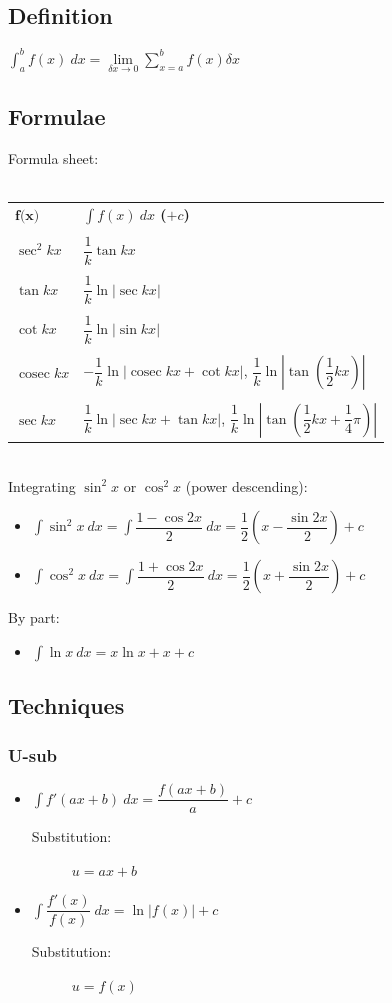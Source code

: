 \documentclass[A4paper]{article}
\DeclareMathOperator\cosec{cosec}
\begin{document}
	\subsection{Definition}
	$\int_{a}^{b} f(x) \: dx = \lim\limits_{\delta x\rightarrow0}\sum_{x=a}^{b}f(x)\delta x$
	
	\subsection{Formulae}
	Formula sheet:\\\\
	\begin{tabular}{ll}
	$\textbf{f(x)}$	& \textbf{$\int f(x) \: dx$ ($+c$)} \\&\\ 
	$\sec^2kx$	& $\dfrac{1}{k} \tan kx$ \\&\\
	$\tan kx$	& $\dfrac{1}{k} \ln |\sec kx|$ \\&\\
	$\cot kx$	& $\dfrac{1}{k} \ln |\sin kx|$ \\&\\
	$\cosec kx$	& $-\dfrac{1}{k} \ln |\cosec kx + \cot kx|$, $\dfrac{1}{k} \ln |\tan (\dfrac{1}{2}kx)|$ \\&\\
	$\sec kx$	& $\dfrac{1}{k} \ln |\sec kx + \tan kx|$, $\dfrac{1}{k} \ln |\tan (\dfrac{1}{2}kx+\dfrac{1}{4}\pi)|$ \\

	\end{tabular}\\
	Integrating $\sin^2x$ or $\cos^2x$ (power descending):
	\begin{itemize}
		\item $\int \sin ^2 x \: dx=\int \dfrac{1-\cos 2x}{2} \: dx=\dfrac{1}{2}(x-\dfrac{\sin 2x}{2})+c$
		\item $\int \cos ^2 x \: dx=\int \dfrac{1+\cos 2x}{2} \: dx= \dfrac{1}{2}(x+\dfrac{\sin 2x}{2})+c$
	\end{itemize}
	By part:
	\begin{itemize}
		\item $\int \ln x \: dx = x\ln x + x + c$
	\end{itemize}
	\subsection{Techniques}
	\subsubsection{U-sub}
	\begin{itemize}
		\item $\int f'(ax+b) \: dx = \dfrac{f(ax+b)}{a}+c$
		\begin{description}
			\item[Substitution:] $u=ax+b$
		\end{description}
		\item $\int \dfrac{f'(x)}{f(x)} \: dx = \ln |f(x)|+c$
		\begin{description}
			\item[Substitution:] $u=f(x)$
		\end{description}
	\end{itemize}
\end{document}
